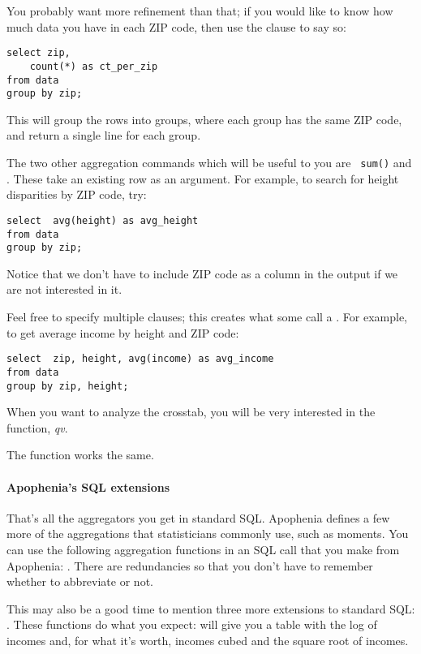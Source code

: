 You probably want more refinement than that; if you would like to
know how much data you have in each ZIP code, then use the  clause to say so:
\begin{lstlisting}
select zip, 
    count(*) as ct_per_zip
from data
group by zip;
\end{lstlisting}
This will group the rows into groups, where each group has the same ZIP
code, and return a single line for each group.


The two other aggregation commands which will be useful to you are {\tt
sum()} and . These take an existing row as an argument.
For example, to search for height disparities by ZIP code, try:
\begin{lstlisting}
select  avg(height) as avg_height
from data
group by zip;
\end{lstlisting}
Notice that we don't have to include ZIP code as a column in the output
if we are not interested in it.

Feel free to specify multiple  clauses; this creates what
some call a . For example, to get average income by
height and ZIP code: 
\begin{lstlisting}
select  zip, height, avg(income) as avg_income
from data
group by zip, height;
\end{lstlisting}

When you want to analyze the crosstab, you will be very
interested in the  function, {\em qv}.

The function  works the same. 

\paragraph{Apophenia's SQL extensions}
That's all the aggregators you get in standard SQL.
Apophenia defines a few more of the aggregations that statisticians
commonly use, such as moments. You can use the following aggregation
functions in an SQL call that you make from Apophenia: . There are redundancies so that you
don't have to remember whether to abbreviate or not.

This may also be a good time to mention three more extensions to standard
SQL: . These functions do what you expect:
will give you a table with the log of incomes and, for what it's worth,
incomes cubed and the square root of incomes.

